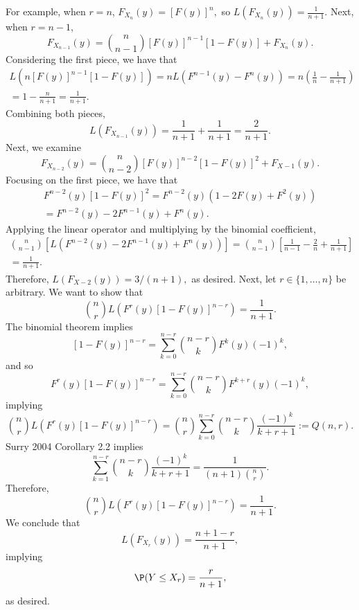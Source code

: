 \documentclass[12pt]{article}
\begin{document}
For example, when $r=n$, $F_{X_n}(y) = [F(y)]^n,$ so $L(F_{X_n}(y)) = \frac{1}{n+1}.$ Next, when $r = n - 1$,
$$F_{X_{n-1}}(y) = \binom{n}{n-1} [F(y)]^{n-1} [1 - F(y)] + F_{X_n}(y).$$
Considering the first piece, we have that
\begin{multline*}
L( n[F(y)]^{n-1}[1-F(y)]) = nL( F^{n-1}(y) - F^n(y)) = n \left( \frac{1}{n} - \frac{1}{n+1} \right) \\ = 1 - \frac{n}{n+1} = \frac{1}{n+1}.
\end{multline*}
Combining both pieces,
$$ L(F_{X_{n-1}}(y)) = \frac{1}{n+1} + \frac{1}{n+1} = \frac{2}{n+1} .$$
Next, we examine
$$F_{X_{n-2}}(y) = \binom{n}{n-2} [F(y)]^{n-2} [1 - F(y)]^{2} + F_{X-1}(y).$$
Focusing on the first piece, we have that
\begin{multline*}
F^{n-2}(y)[1 - F(y)]^2 = F^{n-2}(y) (1 - 2F(y) + F^2(y)) \\ = F^{n-2}(y) - 2 F^{n-1}(y) + F^n(y).
\end{multline*}
Applying the linear operator and multiplying by the binomial coefficient,
\begin{multline*}
\binom{n}{n-1} \left[ L( F^{n-2}(y) - 2 F^{n-1}(y) + F^n(y))\right] = \binom{n}{n-1}\left[ \frac{1}{n-1} -\frac{2}{n} + \frac{1}{n+1} \right] \\ = \frac{1}{n+1}.
\end{multline*}
Therefore, $L(F_{X-2}(y)) = 3/(n+1),$ as desired. Next, let $r \in \{1, \dots, n\}$ be arbitrary. We want to show that
$$\binom{n}{r} L\left( F^r(y) [1 - F(y)]^{n-r}\right) = \frac{1}{n+1}.$$ 
The binomial theorem implies
$$[1- F(y)]^{n-r} = \sum_{k=0}^{n-r} \binom{n-r}{k} F^{k}(y) (-1)^k,$$ and so
$$F^{r}(y) [1 - F(y)]^{n-r} = \sum_{k=0}^{n-r} \binom{n-r}{k} F^{k+r}(y) (-1)^k,$$ implying
$$ \binom{n}{r}L( F^{r}(y) [1 - F(y)]^{n-r} ) = \binom{n}{r} \sum_{k=0}^{n-r} \binom{n-r}{k} \frac{(-1)^k}{k+r+1} := Q(n,r).$$
Surry 2004 Corollary 2.2 implies
$$ \sum_{k=1}^{n-r} \binom{n-r}{k} \frac{(-1)^k}{k+r+1} = \frac{1}{ (n+1) \binom{n}{r}}.$$ Therefore,
$$\binom{n}{r} L(F^r(y)[1 - F(y)]^{n-r}) = \frac{1}{n+1}.$$
We conclude that 
$$ L(F_{X_r}(y)) = \frac{n+1-r}{n+1},$$
implying $$\P(Y \leq X_r) = \frac{r}{n+1},$$ as desired.
\end{document}
